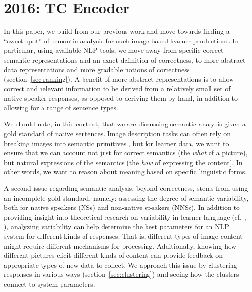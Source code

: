 

\section{2016: TC Encoder}
In this paper, we build from our previous work \citep{king:dickinson:13, king:dickinson:14} and move towards finding a ``sweet spot'' of
semantic analysis \citep[cf.][]{bailey:meurers:08} for such
image-based learner productions.
In particular, using available NLP tools,
we move away from specific correct semantic representations and an
exact definition of correctness, to more abstract data representations
and more gradable notions of correctness (section~\ref{sec:ranking}).
A benefit of more abstract representations is to allow correct
and relevant information to be derived from a relatively small set of
native speaker responses, as opposed to deriving them by hand, in
addition to allowing for a range of sentence types.

We should note, in this context, that we are discussing semantic
analysis given a gold standard of native sentences.  Image description
tasks can often rely on breaking images into semantic primitives
\citep[see, e.g.,][and references therein]{ortiz:wolff:lapata:15}, but
for learner data, we want to ensure that we can account not just for
correct semantics (the \emph{what} of a picture), but natural
expressions of the semantics (the \emph{how} of expressing the
content).  In other words, we want to reason about meaning based on
specific linguistic forms.

A second issue regarding semantic analysis, beyond correctness, stems
from using an incomplete gold standard, namely: assessing the degree
of semantic variability, both for native speakers (NSs) and non-native
speakers (NNSs).
In addition to providing insight into
theoretical research on variability 
in learner language (cf. \citet{ellis1987variability}, \citet{kanno1998consistency}), analyzing variability can help determine
the best parameters for an NLP system for different kinds of
responses.  That is, different types of image content might require
different mechanisms for processing.  Additionally, knowing how
different pictures elicit different kinds of content can provide
feedback on appropriate types of new data to collect.
We approach this issue by clustering responses in various ways
(section~\ref{sec:clustering}) and seeing how the clusters connect to
system parameters.


